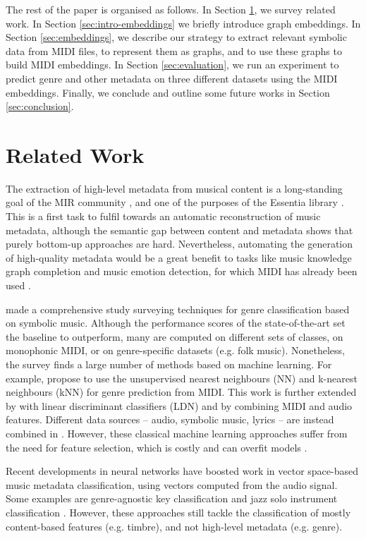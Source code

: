 \documentclass{article}
\begin{document}
The rest of the paper is organised as follows. In Section \ref{sec:related-work}, we survey related work. In Section \ref{sec:intro-embeddings} we briefly introduce graph embeddings. In Section \ref{sec:embeddings}, we describe our strategy to extract relevant symbolic data from MIDI files, to represent them as graphs, and to use these graphs to build MIDI embeddings. In Section \ref{sec:evaluation}, we run an experiment to predict genre and other metadata on three different datasets using the MIDI embeddings. Finally, we conclude and outline some future works in Section \ref{sec:conclusion}.

\section{Related Work}
\label{sec:related-work}
The extraction of high-level metadata from musical content is a long-standing goal of the MIR community \citep{casey2008content}, and one of the purposes of the Essentia library \citep{bogdanov2013essentia}. This is a first task to fulfil towards an automatic reconstruction of music metadata, although the semantic gap \citep{celma2008foafing} between content and metadata shows that purely bottom-up approaches are hard. Nevertheless, automating the generation of high-quality metadata would be a great benefit to tasks like music knowledge graph completion and music emotion detection, for which MIDI has already been used \citep{merono2017midi,MUSE2018}.

\cite{correa2016survey} made a comprehensive study surveying techniques for genre classification based on symbolic music. Although the performance scores of the state-of-the-art set the baseline to outperform, many are computed on different sets of classes, on monophonic MIDI, or on genre-specific datasets (e.g. folk music). Nonetheless, the survey finds a large number of methods based on machine learning. For example, \cite{McKay2004} propose to use the unsupervised nearest neighbours (NN) and k-nearest neighbours (kNN) for genre prediction from MIDI. This work is further extended by \cite{Cataltepe2007} with linear discriminant classifiers (LDN) and by combining MIDI and audio features. Different data sources -- audio, symbolic music, lyrics -- are instead combined in \cite{mckay2010datasetslac}. However, these classical machine learning approaches suffer from the need for feature selection, which is costly and can overfit models \citep{guyon2003introduction}.

Recent developments in neural networks have boosted work in vector space-based music metadata classification, using vectors computed from the audio signal. Some examples are genre-agnostic key classification \citep{korzeniowski2018} and jazz solo instrument classification \citep{gomez2018}. However, these approaches still tackle the classification of mostly content-based features (e.g. timbre), and not high-level metadata (e.g. genre).
\end{document}
